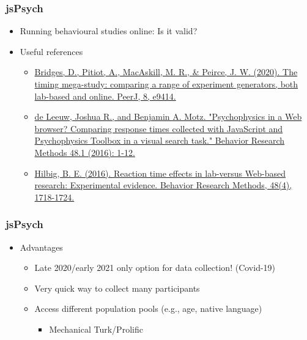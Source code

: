 \documentclass[t]{beamer}
\begin{document}
\begin{frame}[fragile]
    \frametitle{jsPsych}
    \begin{itemize}
        \item Running behavioural studies online: Is it valid?
        \item Useful references
            \begin{itemize}\scriptsize
                \item \href{https://peerj.com/articles/9414/}{Bridges, D., Pitiot, A., MacAskill, M. R., \& Peirce, J. W. (2020). The timing mega-study: comparing a range of experiment generators, both lab-based and online. PeerJ, 8, e9414.}
                \item \href{https://link.springer.com/article/10.3758/s13428-015-0567-2}{de Leeuw, Joshua R., and Benjamin A. Motz. "Psychophysics in a Web browser? Comparing response times collected with JavaScript and Psychophysics Toolbox in a visual search task." Behavior Research Methods 48.1 (2016): 1-12.}
                \item \href{https://link.springer.com/article/10.3758/s13428-015-0678-9}{Hilbig, B. E. (2016). Reaction time effects in lab-versus Web-based research: Experimental evidence. Behavior Research Methods, 48(4), 1718-1724.}
            \end{itemize}
    \end{itemize}
\end{frame}


\begin{frame}[fragile]
    \frametitle{jsPsych}
    \begin{itemize}
        \item Advantages 
            \begin{itemize}
                \item Late 2020/early 2021 only option for data collection! (Covid-19)
                \item Very quick way to collect many participants 
                \item Access different population pools (e.g., age, native language)
                    \begin{itemize}
                        \item Mechanical Turk/Prolific
                    \end{itemize}
            \end{itemize}
    \end{itemize}
\end{frame}
\end{document}
